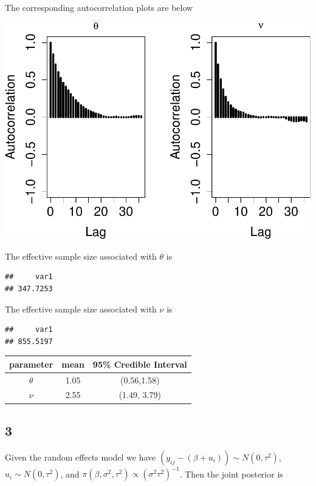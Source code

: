 \documentclass[]{article}
\begin{document}
The corresponding autocorrelation plots are below

\includegraphics{AMS206b_H4_files/figure-latex/unnamed-chunk-29-1.pdf}

The effective sample size associated with \(\theta\) is

\begin{verbatim}
##     var1 
## 347.7253
\end{verbatim}

The effective sample size associated with \(\nu\) is

\begin{verbatim}
##     var1 
## 855.5197
\end{verbatim}

\begin{center}
\begin{tabular}{ |c|c|c| }
\hline
 parameter & mean & 95\% Credible Interval \\ 
 \hline
 $\theta$ & 1.05 & (0.56,1.58) \\  
 $\nu$ & 2.55 & (1.49, 3.79)\\
 \hline
\end{tabular}
\end{center}

\subsection{3}\label{section}

Given the random effects model we have
\((y_{ij} -(\beta + u_i)) \sim N(0,\tau^2)\), \(u_i \sim N(0,\tau^2)\),
and \(\pi(\beta,\sigma^2,\tau^2) \propto (\sigma^2 \tau^2)^{-1}\). Then
the joint posterior is
\end{document}

